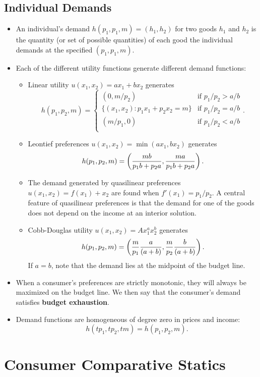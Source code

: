 \documentclass[a4paper]{article}
\begin{document}
\subsection{Individual Demands}
\begin{itemize}
    \item An individual's demand $h(p_1, p_1, m) = (h_1, h_2)$ for two goods $h_1$ and $h_2$ is the quantity (or set of possible quantities) of each good the individual demands at the specified $(p_1, p_1, m)$. 
    \item Each of the different utility functions generate different demand functions: 
    \begin{itemize}
        \item Linear utility $u(x_1, x_2) = ax_1 + bx_2$ generates
        $$h(p_1, p_2, m) = 
        \begin{cases}
        (0, m / p_2) & \text{if } p_1/p_2 > a / b \\
        \{(x_1, x_2) : p_1 x_1 + p_2 x_2 = m\} & \text{if } p_1/p_2 = a/b \\
        (m / p_1, 0) & \text{if } p_1/p_2 < a / b \\
        \end{cases}.$$
        \item Leontief preferences $u(x_1, x_2) = \min(ax_1, bx_2)$ generates $$h(p_1, p_2, m) = \left( \frac{mb}{p_1 b + p_2 a}, \frac{ma}{p_1 b + p_2 a} \right).$$
        \item The demand generated by quasilinear preferences $u(x_1, x_2) = f(x_1) + x_2$ are found when $f'(x_1) = p_1/p_2$. A central feature of quasilinear preferences is that the demand for one of the goods does not depend on the income at an interior solution.
        \item Cobb-Douglas utility $u(x_1, x_2) = Ax_1^ax_2^b$ generates $$h(p_1, p_2, m) = \left( \frac{m}{p_1}\frac{a}{(a + b)}, \frac{m}{p_2}\frac{b}{(a + b)} \right).$$ If $a = b$, note that the demand lies at the midpoint of the budget line.
    \end{itemize}
    \item When a consumer's preferences are strictly monotonic, they will always be maximized on the budget line. We then say that the consumer's demand satisfies \textbf{budget exhaustion}.
    \item Demand functions are homogeneous of degree zero in prices and income: $$h(t p_1, t p_2, t m) = h(p_1, p_2, m).$$
\end{itemize}

\section{Consumer Comparative Statics}
\end{document}
